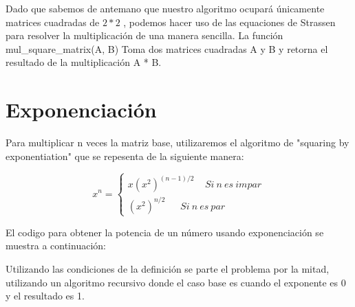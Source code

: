 \documentclass{article}
\begin{document}
\vspace{5mm} %

Dado que sabemos de antemano que nuestro algoritmo ocupará únicamente matrices cuadradas de 
\begin{math}
    2*2
\end{math}
, podemos hacer uso de las equaciones de Strassen para resolver la multiplicación de una manera sencilla. La función
    mul\_square\_matrix(A, B)
Toma dos matrices cuadradas A y B y retorna el resultado de la multiplicación A * B.

\section{Exponenciación}

Para multiplicar n veces la matriz base, utilizaremos el algoritmo de "squaring by exponentiation" que se repesenta de la siguiente manera:

\vspace{5mm} %

\begin{displaymath}
    x^n = \left\lbrace\begin{array}{c}
    x(x^2)^{(n-1)/2}~~~~~Si~n~es~impar\\
    (x^2)^{n/2}~~~~~~~Si~n~es~par
    \end{array}\right.
\end{displaymath}

\vspace{15mm} %

El codigo para obtener la potencia de un número usando exponenciación se muestra a continuación:

\vspace{5mm} %



\vspace{5mm} %

Utilizando las condiciones de la definición se parte el problema por la mitad, utilizando un algoritmo recursivo donde el caso base es cuando el exponente es 0 y el resultado es 1.
\end{document}
